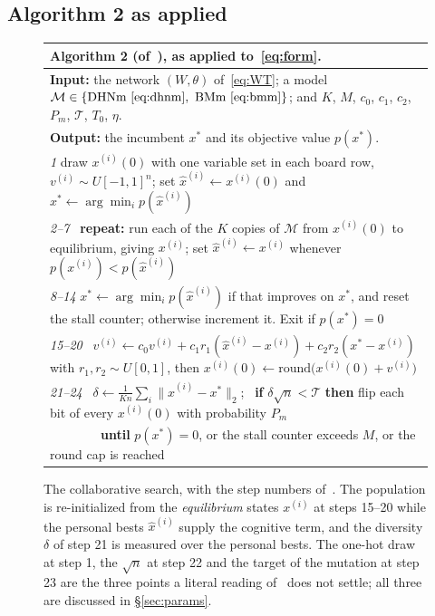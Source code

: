 \documentclass{easychair}
\newcommand{\secref}[1]{\hyperref[#1]{\textcolor{academicpurple}{\S\ref*{#1}}}}
\newcommand{\citeref}[1]{\textcolor{academicpurple}{\cite{#1}}}
\begin{document}
\subsection{Algorithm 2 as applied}\label{sec:alg}

\begin{figure}[t]
\centering\small
\setlength{\tabcolsep}{0pt}
\begin{tabular}{@{}p{}@{}}
\toprule
\textbf{Algorithm 2} (of~\citeref{liwang2022}), as applied to~\eqref{eq:form}.\\
\midrule
\textbf{Input:} the network $(W,\theta)$ of~\eqref{eq:WT}; a model $\mathcal{M} \in
\{\text{DHNm}~\eqref{eq:dhnm},\ \text{BMm}~\eqref{eq:bmm}\}$; and $K$, $M$, $c_0$, $c_1$, $c_2$,
$P_m$, $\mathcal{T}$, $T_0$, $\eta$.\\
\textbf{Output:} the incumbent $x^{*}$ and its objective value $p(x^{*})$.\\
\midrule
\emph{1} \quad draw $x^{(i)}(0)$ with one variable set in each board row, $v^{(i)} \sim
U[-1,1]^{n}$; set $\hat x^{(i)} \leftarrow x^{(i)}(0)$ and $x^{*} \leftarrow \arg\min_i
p(\hat x^{(i)})$\\
\emph{2--7} \quad\, \textbf{repeat:} run each of the $K$ copies of $\mathcal{M}$ from $x^{(i)}(0)$ to
equilibrium, giving $x^{(i)}$; set $\hat x^{(i)} \leftarrow x^{(i)}$ whenever
$p(x^{(i)}) < p(\hat x^{(i)})$\\
\emph{8--14} \quad $x^{*} \leftarrow \arg\min_i p(\hat x^{(i)})$ if that improves on $x^{*}$, and
reset the stall counter; otherwise increment it. Exit if $p(x^{*}) = 0$\\
\emph{15--20} \, $v^{(i)} \leftarrow c_0 v^{(i)} + c_1 r_1 (\hat x^{(i)} - x^{(i)})
+ c_2 r_2 (x^{*} - x^{(i)})$ with $r_1, r_2 \sim U[0,1]$, then
$x^{(i)}(0) \leftarrow \mathrm{round}\bigl(x^{(i)}(0) + v^{(i)}\bigr)$\\
\emph{21--24} \, $\delta \leftarrow \frac{1}{Kn}\sum_i \lVert \hat x^{(i)} - x^{*}\rVert_2$;
\ \textbf{if} $\delta\sqrt{n} < \mathcal{T}$ \textbf{then} flip each bit of every $x^{(i)}(0)$ with
probability $P_m$\\
\quad\ \ \ \ \ \ \ \, \textbf{until} $p(x^{*}) = 0$, or the stall counter exceeds $M$, or the round
cap is reached\\
\bottomrule
\end{tabular}
\caption{The collaborative search, with the step numbers of~\citeref{liwang2022}. The population is
re-initialized from the \emph{equilibrium} states $x^{(i)}$ at steps 15--20 while the personal bests
$\hat x^{(i)}$ supply the cognitive term, and the diversity $\delta$ of step 21 is measured over the
personal bests. The one-hot draw at step 1, the $\sqrt{n}$ at step 22 and the target of the mutation at
step 23 are the three points a literal reading of~\citeref{liwang2022} does not settle; all three are
discussed in \secref{sec:params}.}\label{fig:alg}
\end{figure}
\end{document}
